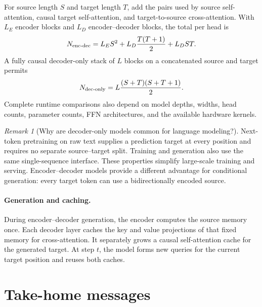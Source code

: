 \documentclass[11pt,twoside]{article}
\theoremstyle{plain}
\theoremstyle{definition}
\theoremstyle{remark}
\newtheorem{remark}{Remark}[section]
\begin{document}
For source length $S$ and target length $T$, add the pairs used by source
self-attention, causal target self-attention, and target-to-source
cross-attention. With $L_E$ encoder blocks and $L_D$ encoder--decoder blocks,
the total per head is
\begin{equation}
N_{\rm enc\text{-}dec}
=L_ES^2+L_D\frac{T(T+1)}2+L_DST.
\label{eq:encoder-decoder-score-count}
\end{equation}
A fully causal decoder-only
stack of $L$ blocks on a concatenated source and target permits
\begin{equation}
N_{\rm dec\text{-}only}
=L\frac{(S+T)(S+T+1)}2.
\label{eq:decoder-only-score-count}
\end{equation}
Complete runtime comparisons also depend on model depths, widths, head counts,
parameter counts, FFN architectures, and the available hardware kernels.

\begin{remark}[Why are decoder-only models common for language modeling?]
\label{rem:decoder-only-language-modeling}
Next-token pretraining on raw text supplies a prediction target at every
position and requires no separate source--target split. Training and generation
also use the same single-sequence interface. These properties simplify
large-scale training and serving. Encoder--decoder models provide a different
advantage for conditional generation: every target token can use a
bidirectionally encoded source.
\end{remark}

\paragraph{Generation and caching.}
During encoder--decoder generation, the encoder computes the source memory once.
Each decoder layer caches the key and value projections of that fixed memory
for cross-attention. It separately grows a causal self-attention cache for the
generated target. At step $t$, the model forms new queries for the current
target position and reuses both caches.

\section{Take-home messages}
\end{document}
